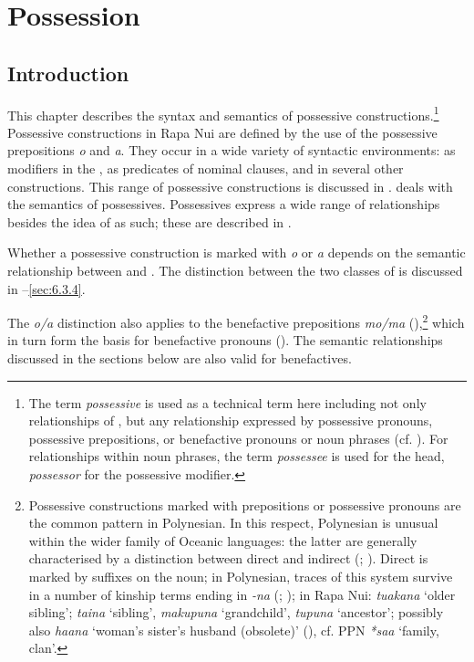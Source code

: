 \chapter[Possession]{Possession}\label{ch:6}
\section{Introduction}\label{sec:6.1}
This chapter describes the syntax and semantics of possessive constructions.\footnote{\label{fn:282}The term \textit{possessive} is used as a technical term here including not only relationships of , but any relationship expressed by possessive pronouns, possessive prepositions, or benefactive pronouns or noun phrases (cf. \citealt[94]{Lichtenberk1985}). For relationships within noun phrases, the term \textit{possessee} is used for the head, \textit{possessor} for the possessive modifier.} Possessive constructions in Rapa Nui are defined by the use of the possessive prepositions \textit{o} and \textit{{\ꞌ}a}. They occur in a wide variety of syntactic environments: as modifiers in the , as predicates of nominal clauses, and in several other constructions. This range of possessive constructions is discussed in .  deals with the semantics of possessives. Possessives express a wide range of relationships besides the idea of  as such; these are described in . 

Whether a possessive construction is marked with \textit{o} or \textit{a} depends on the semantic relationship between  and . The distinction between the two classes of  is discussed in –\ref{sec:6.3.4}.

The \textit{o/a} distinction also applies to the benefactive prepositions \textit{mo/ma} (),\footnote{\label{fn:283}Possessive constructions marked with prepositions or possessive pronouns are the common pattern in Polynesian. In this respect, Polynesian is unusual within the wider family of Oceanic languages: the latter are generally characterised by a distinction between direct and indirect  (\citealt{Lynch1997}; \citealt{Lichtenberk1985}). Direct  is marked by suffixes on the noun; in Polynesian, traces of this system survive in a number of kinship terms ending in \textit{-na} (\citealt{Lynch1997}; \citealt{Marck1996Kin}); in Rapa Nui: \textit{tuakana} ‘older sibling’; \textit{taina} ‘sibling’, \textit{makupuna} ‘grandchild’, \textit{tupuna} ‘ancestor’; possibly also \textit{ha{\ꞌ}ana} ‘woman’s sister’s husband (obsolete)’ (\citealt[99]{Métraux1971}), cf. PPN \textit{*sa{\ꞌ}a} ‘family, clan’.} which in turn form the basis for benefactive pronouns (). The semantic relationships discussed in the sections below are also valid for benefactives.

